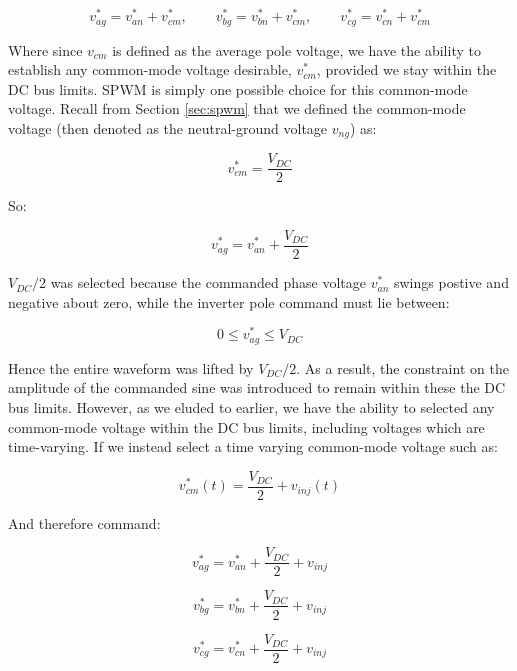 \documentclass{article}
\begin{document}
\begin{equation}
    v_{ag}^* = v_{an}^* + v_{cm}^*, \qquad
    v_{bg}^* = v_{bn}^* + v_{cm}^*, \qquad
    v_{cg}^* = v_{cn}^* + v_{cm}^*
\end{equation}

Where since $v_{cm}$ is defined as the average pole voltage, we have the ability to establish any common-mode voltage desirable, $v_{cm}^*$, provided we stay within the DC bus limits. SPWM is simply one possible choice for this common-mode voltage. Recall from Section \ref{sec:spwm} that we defined the common-mode voltage (then denoted as the neutral-ground voltage $v_{ng}$) as:

\begin{equation}
    v_{cm}^* = \frac{V_{DC}}{2}
\end{equation}

So:

\begin{equation}
    v_{ag}^* = v_{an}^* + \frac{V_{DC}}{2}
\end{equation}

$V_{DC}/2$ was selected because the commanded phase voltage $v_{an}^*$ swings postive and negative about zero, while the inverter pole command must lie between:

\[
    0 \leq v_{ag}^* \leq V_{DC}
\]

Hence the entire waveform was lifted by $V_{DC}/2$. As a result, the constraint on the amplitude of the commanded sine was introduced to remain within these the DC bus limits. However, as we eluded to earlier, we have the ability to selected any common-mode voltage within the DC bus limits, including voltages which are time-varying. If we instead select a time varying common-mode voltage such as:

\begin{equation}
    v_{cm}^*(t) = \frac{V_{DC}}{2} + v_{inj}(t)
\end{equation}

And therefore command:

\begin{equation}
    v_{ag}^* = v_{an}^* + \frac{V_{DC}}{2} + v_{inj}
\end{equation}

\begin{equation}
    v_{bg}^* = v_{bn}^* + \frac{V_{DC}}{2} + v_{inj}
\end{equation}

\begin{equation}
    v_{cg}^* = v_{cn}^* + \frac{V_{DC}}{2} + v_{inj}
\end{equation}
\end{document}
